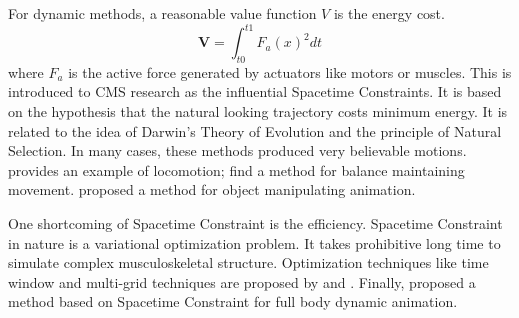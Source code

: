 For dynamic methods, a reasonable value function $V$ is the energy cost. 
\begin{equation}
 \textbf{V}=\int_{t0}^{t1}F_{a}(x)^2dt
\end{equation}
where $F_{a}$ is the active force generated by actuators like motors or muscles. 
This is introduced to CMS research as the influential Spacetime Constraints\citep{Witkin1988}. 
It is based on the hypothesis that the natural looking trajectory costs minimum energy. 
It is related to the idea of Darwin's Theory of Evolution and the principle of Natural Selection. 
In many cases, these methods produced very believable motions. 
\citet{Jain2009} provides an example of locomotion;  
\citet{BalanceControl} find a method for balance maintaining movement. 
\citet{Liu2009} proposed a method for object manipulating animation. 

One shortcoming of Spacetime Constraint is the efficiency.
Spacetime Constraint in nature is a variational optimization problem. 
It takes prohibitive long time to simulate complex musculoskeletal structure\citep{Anderson2001}. 
Optimization techniques like time window and multi-grid techniques are proposed by \citet{Cohen1992} and \citet{Liu1994}. 
Finally, \citet{Popovi'c1999} proposed a method based on Spacetime Constraint for full body dynamic animation.

